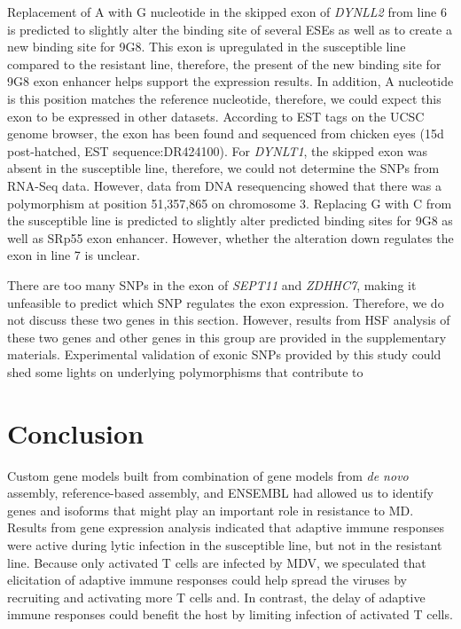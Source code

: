\documentclass[10pt]{article}
\begin{document}
Replacement of A with G nucleotide in the skipped exon of {\em
DYNLL2} from line 6 is predicted to slightly alter the binding
site of several ESEs as well as to create a new binding site for
9G8.  This exon is upregulated in the susceptible line compared
to the resistant line, therefore, the present of the new binding
site for 9G8 exon enhancer helps support the expression results.
In addition, A nucleotide is this position matches the reference
nucleotide, therefore, we could expect this exon to be expressed
in other datasets.  According to EST tags on the UCSC genome
browser, the exon has been found and sequenced from chicken eyes
(15d post-hatched, EST sequence:DR424100).  For {\em DYNLT1}, the
skipped exon was absent in the susceptible line, therefore, we
could not determine the SNPs from RNA-Seq data.  However, data
from DNA resequencing showed that there was a polymorphism at
position 51,357,865 on chromosome 3.  Replacing G with C from the
susceptible line is predicted to slightly alter predicted binding
sites for 9G8 as well as SRp55 exon enhancer.  However, whether
the alteration down regulates the exon in line 7 is unclear.

There are too many SNPs in the exon of {\em SEPT11} and {\em
ZDHHC7}, making it unfeasible to predict which SNP regulates the
exon expression.  Therefore, we do not discuss these two genes in
this section.  However, results from HSF analysis of these two
genes and other genes in this group are provided in the
supplementary materials.  Experimental validation of exonic SNPs
provided by this study could shed some lights on underlying
polymorphisms that contribute to

\section*{Conclusion}

Custom gene models built from combination of gene models from
{\em de novo} assembly, reference-based assembly, and ENSEMBL had
allowed us to identify genes and isoforms that might play an
important role in resistance to MD.  Results from gene expression
analysis indicated that adaptive immune responses were active
during lytic infection in the susceptible line, but not in the
resistant line.  Because only activated T cells are infected by
MDV, we speculated that elicitation of adaptive immune responses
could help spread the viruses by recruiting and activating more T
cells and.  In contrast, the delay of adaptive immune responses
could benefit the host by limiting infection of activated T
cells.
\end{document}
